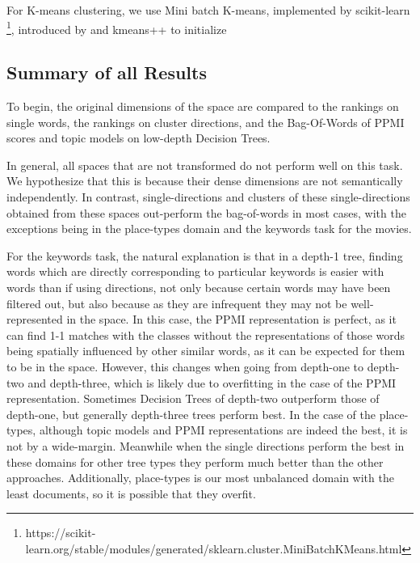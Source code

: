 For K-means clustering, we use Mini batch K-means, implemented by scikit-learn \footnote{https://scikit-learn.org/stable/modules/generated/sklearn.cluster.MiniBatchKMeans.html}, introduced by \cite{Sculley2010} and kmeans++ to initialize \cite{Arthur}

\subsection{Summary of all Results}

To begin, the original dimensions of the space are compared to the rankings on single words, the rankings on cluster directions, and the Bag-Of-Words of PPMI scores and topic models on low-depth Decision Trees. 

In general, all spaces that are not transformed do not perform well on this task. We hypothesize that this is because their dense dimensions are not semantically independently. In contrast, single-directions and clusters of these single-directions obtained from these spaces out-perform the bag-of-words in most cases, with the exceptions being in the place-types domain and the keywords task for the movies. 

For the keywords task, the natural explanation is that in a depth-1 tree, finding words which are directly corresponding to particular keywords is easier with words than if using directions, not only because certain words may have been filtered out, but also because as they are infrequent they may not be well-represented in the space. In this case, the PPMI representation is perfect, as it can find 1-1 matches with the classes without the representations of those words being spatially influenced by other similar words, as it can be expected for them to be in the space. However, this changes when going from depth-one to depth-two and depth-three, which is likely  due to overfitting in the case of the PPMI representation. Sometimes Decision Trees of depth-two outperform those of depth-one, but generally depth-three trees perform best.  In the case of the place-types, although topic models and PPMI representations are indeed the best, it is not by a wide-margin. Meanwhile when the single directions perform the best in these domains for other tree types they perform much better than the other approaches. Additionally, place-types is our most unbalanced domain with the least documents, so it is possible that they overfit. 





